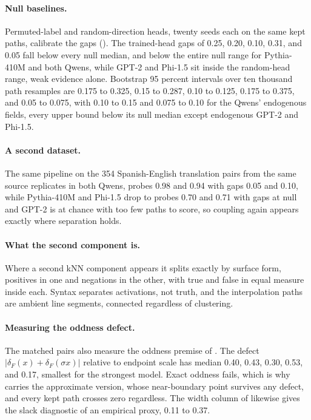 \documentclass[mlmain,onecolumn]{jmlr}
\newcommand{\dF}{\delta_{\!F}}
\begin{document}
\paragraph{Null baselines.}
Permuted-label and random-direction heads, twenty seeds each on
the same kept paths, calibrate the gaps
(). The trained-head gaps of 0.25, 0.20,
0.10, 0.31, and 0.05 fall below every null median, and below the
entire null range for Pythia-410M and both Qwens, while GPT-2 and
Phi-1.5 sit inside the random-head range, weak evidence alone.
Bootstrap 95 percent intervals over ten thousand path resamples are
0.175 to 0.325, 0.15 to 0.287, 0.10 to 0.125, 0.175 to 0.375, and
0.05 to 0.075, with 0.10 to 0.15 and 0.075 to 0.10 for the Qwens'
endogenous fields, every upper bound below its null median except
endogenous GPT-2 and Phi-1.5.

\paragraph{A second dataset.}
The same pipeline on the 354 Spanish-English translation pairs from
the same source replicates in both Qwens, probes 0.98 and 0.94 with
gaps 0.05 and 0.10, while Pythia-410M and Phi-1.5 drop to probes
0.70 and 0.71 with gaps at null and GPT-2 is at chance with too few
paths to score, so coupling again appears exactly where separation
holds.

\paragraph{What the second component is.}
Where a second kNN component appears it splits exactly by surface
form, positives in one and negations in the other, with true and
false in equal measure inside each. Syntax separates activations,
not truth, and the interpolation paths are ambient line segments,
connected regardless of clustering.

\paragraph{Measuring the oddness defect.}
The matched pairs also measure the oddness premise of
. The defect $|\dF(x) + \dF(\sigma x)|$
relative to endpoint scale has median 0.40, 0.43, 0.30, 0.53, and
0.17, smallest for the strongest model. Exact oddness fails, which
is why  carries the approximate version,
whose near-boundary point survives any defect, and every kept path
crosses zero regardless. The width column of
 likewise gives the slack diagnostic of
 an empirical proxy, 0.11 to 0.37.
\end{document}
